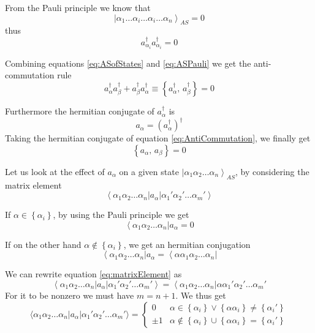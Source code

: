 From the Pauli principle we know that
\[
	\left|\alpha_{1}\dots\alpha_{i}\dots\alpha_{i}\dots\alpha_{n}\right\rangle_{AS}=0
\]
thus
\begin{equation}\label{eq:ASPauli}
	a_{\alpha_{i}}^{\dagger}a_{\alpha_{i}}^{\dagger}=0
\end{equation}

Combining equations \ref{eq:ASofStates} and \ref{eq:ASPauli} we get the anti-commutation rule
\begin{equation}\label{eq:AntiCommutation}
	a_{\alpha}^{\dagger}a_{\beta}^{\dagger}+a_{\beta}^{\dagger}a_{\alpha}^{\dagger}\equiv\left\{ a_{\alpha}^{\dagger},\, a_{\beta}^{\dagger}\right\} =0
\end{equation}

Furthermore the hermitian conjugate of $a_{\alpha}^{\dagger}$ is
\[
	a_{\alpha}=\left(a_{\alpha}^{\dagger}\right)^{\dagger}
\]
Taking the hermitian conjugate of equation \ref{eq:AntiCommutation}, we finally get
\[
	\left\{ a_{\alpha},\, a_{\beta}\right\} = 0
\]


Let us look at the effect of $a_{\alpha}$ on a given state $\left|\alpha_{1}\alpha_{2}\dots\alpha_{n}\right\rangle_{AS}$, by considering the matrix element
\begin{equation}\label{eq:matrixElement}
	\left\langle\alpha_{1}\alpha_{2}\dots\alpha_{n}\right | a_{\alpha} \left | \alpha_{1}'\alpha_{2}'\dots\alpha_{m}'\right\rangle
\end{equation}

If $\alpha \in \left\{\alpha_{i}\right\}$, by using the Pauli principle we get
\[
	\left\langle\alpha_{1}\alpha_{2}\dots\alpha_{n}\right | a_{\alpha} = 0
\]

If on the other hand $\alpha \notin \left\{\alpha_{i}\right\}$, we get an hermitian conjugation
\[
	\left\langle\alpha_{1}\alpha_{2}\dots\alpha_{n}\right | a_{\alpha} = \left\langle\alpha\alpha_{1}\alpha_{2}\dots\alpha_{n}\right |
\]

We can rewrite equation \ref{eq:matrixElement} as 
\begin{equation}\label{eq:matrixElementRewritten}
	\left\langle\alpha_{1}\alpha_{2}\dots\alpha_{n}\right | a_{\alpha} \left | \alpha_{1}'\alpha_{2}'\dots\alpha_{m}'\right\rangle = \left\langle\alpha_{1}\alpha_{2}\dots\alpha_{n}\right | \alpha\alpha_{1}'\alpha_{2}'\dots\alpha_{m}'
\end{equation}
For it to be nonzero we must have $m=n+1$. We thus get
\begin{equation}\label{eq:matrixElementCases}
	\langle\alpha_{1}\alpha_{2}\dots\alpha_{n}|a_{\alpha}|\alpha_{1}'\alpha_{2}'\dots\alpha_{m}'\rangle=\begin{cases}
	0 & \alpha\in\left\{ \alpha_{i}\right\} \lor\left\{ \alpha\alpha_{i}\right\} \neq\left\{ \alpha_{i}'\right\} \\
	\pm1 & \alpha\notin\left\{ \alpha_{i}\right\} \cup\left\{ \alpha\alpha_{i}\right\} =\left\{ \alpha_{i}'\right\} 
	\end{cases}
\end{equation}

